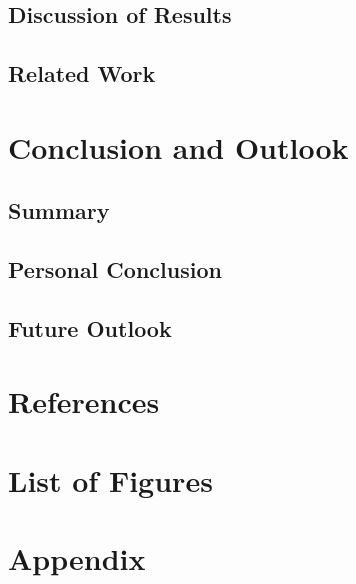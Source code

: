 \documentclass[11pt, a4paper, oneside]{scrartcl}
\begin{document}
        \subsection{Discussion of Results}

        \subsection{Related Work}

    \section{Conclusion and Outlook}

        \subsection{Summary}

        \subsection{Personal Conclusion}

        \subsection{Future Outlook}

    \section*{References}
        \printbibliography[heading=none]

    \section*{List of Figures}
        \begingroup
            \renewcommand{\listfigurename}{} %
            \listoffigures
        \endgroup

    \section*{Appendix}
\end{document}

